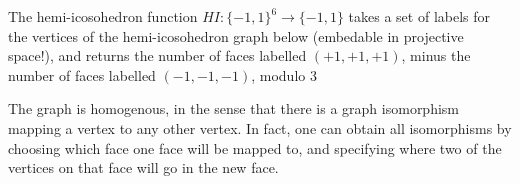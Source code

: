 \begin{example}
    The hemi-icosohedron function $HI: \{ -1, 1 \}^6 \to \{ -1, 1 \}$ takes a set of labels for the vertices of the hemi-icosohedron graph below (embedable in projective space!), and returns the number of faces labelled $(+1,+1,+1)$, minus the number of faces labelled $(-1,-1,-1)$, modulo 3
\begin{center}
\end{center}
    The graph is homogenous, in the sense that there is a graph isomorphism mapping a vertex to any other vertex. In fact, one can obtain all isomorphisms by choosing which face one face will be mapped to, and specifying where two of the vertices on that face will go in the new face.


\end{example}

